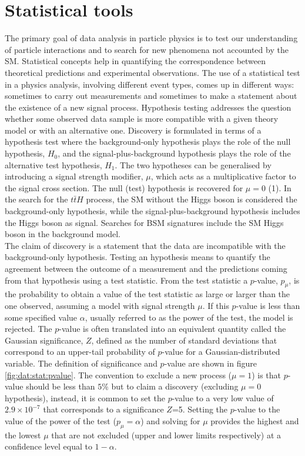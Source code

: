 \section{Statistical tools}
\label{chp:sec:stat}
The primary goal of data analysis in particle physics is to test our understanding of particle interactions and to search for new phenomena not accounted by the SM. Statistical concepts help in quantifying the correspondence between theoretical predictions and experimental observations. 
The use of a statistical test in a physics analysis, involving different event types, comes up in different ways: sometimes to carry out measurements and sometimes to make a statement about the existence of a new signal process.
Hypothesis testing addresses the question whether some observed data sample is more compatible with a given theory model or with an alternative one.
Discovery is formulated in terms of a hypothesis test where the background-only hypothesis plays the role of the null hypothesis, $H_{0}$, and the signal-plus-background hypothesis plays the role of the alternative test hypothesis, $H_{1}$. The two hypotheses can be generalised by introducing a signal strength modifier, $\mu$,
which acts as a multiplicative factor to the signal cross section. The null (test) hypothesis is recovered for $\mu=0$ (1). In the search for the $t\bar{t}H$ process, the SM without the Higgs boson is considered the background-only hypothesis, while the signal-plus-background hypothesis includes the Higgs boson as signal. Searches for BSM signatures include the SM Higgs boson in the background model.\\ \indent The claim of discovery is a statement that the data are incompatible with the background-only hypothesis.  Testing an hypothesis means to quantify the agreement between the outcome of a measurement and the predictions coming from that hypothesis using a test statistic. From the test statistic a $p$-value, $p_{\mu}$, is the probability to obtain a value of the test statistic as large or larger than the one observed, assuming a model with signal strength $\mu$. If this $p$-value is less than some specified value $\alpha$, usually referred to as the power of the test, the model is rejected. The $p$-value is often translated into an equivalent quantity called the Gaussian significance, $Z$, defined as the number of standard deviations that correspond to an upper-tail probability of $p$-value for a Gaussian-distributed variable. The definition of significance and $p$-value are shown in figure \ref{fig:dat:stat:pvalue}. The convention to exclude a new process ($\mu=1$) is that $p$-value should be less than $5\%$ but to claim a discovery (excluding $\mu=0$ hypothesis), instead, it is common to set the $p$-value to a very low value of $2.9\times 10^{-7}$ that corresponds to a significance $Z$=5. 
Setting the $p$-value to the value of the power of the test ($p_{\mu}=\alpha$) and solving for $\mu$ provides the highest and the lowest $\mu$ that are not excluded (upper and lower limits respectively) at a confidence level equal to $1-\alpha$. 


